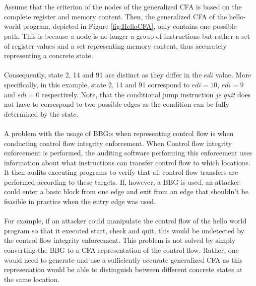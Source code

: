 \documentclass{kththesis}
\renewcommand{\it}[1]{\textit{#1}}
\begin{document}
\\ \\
Assume that the criterion of the nodes of the generalized CFA is based on the complete register and memory content. Then, the generalized CFA of the hello-world program, depicted in Figure \ref{fig:HelloCFA}, only contains one possible path. This is because a node is no longer a group of instructions but rather a set of register values and a set representing memory content, thus accurately representing a concrete state. 
\\ \\
Consequently, state 2, 14 and 91 are distinct as they differ in the $edi$ value. More specifically, in this example, state 2, 14 and 91 correspond to $edi=10$, $edi=9$ and $edi=0$ respectively. Note, that the conditional jump instruction \it{je quit} does not have to correspond to two possible edges as the condition can be fully determined by the state.
\\ \\
A problem with the usage of BBG:s when representing control flow is when conducting control flow integrity enforcement\cite{CFIEnforcement}. When Control flow integrity enforcement is performed, the auditing software performing this enforcement uses information about what instructions can transfer control flow to which locations. It then audits executing programs to verify that all control flow transfers are performed according to these targets. If, however, a BBG is used, an attacker could enter a basic block from one edge and exit from an edge that shouldn't be feasible in practice when the entry edge was used. 
\\ \\
For example, if an attacker could manipulate the control flow of the hello world program so that it executed start, check and quit, this would be undetected by the control flow integrity enforcement. This problem is not solved by simply converting the BBG to a CFA representation of the control flow. Rather, one would need to generate and use a sufficiently accurate generalized CFA as this represenation would be able to distinguish between different concrete states at the same location.
\end{document}
